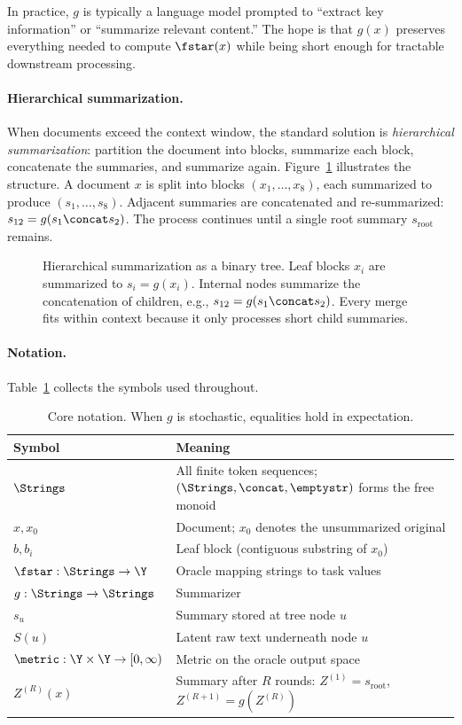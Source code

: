 In practice, $g$ is typically a language model prompted to ``extract key information'' or ``summarize relevant content.'' The hope is that $g(x)$ preserves everything needed to compute $\fstar(x)$ while being short enough for tractable downstream processing.

\paragraph{Hierarchical summarization.}
When documents exceed the context window, the standard solution is \emph{hierarchical summarization}: partition the document into blocks, summarize each block, concatenate the summaries, and summarize again. Figure~\ref{fig:hierarchical_summarization} illustrates the structure. A document $x$ is split into blocks $(x_1, \ldots, x_8)$, each summarized to produce $(s_1, \ldots, s_8)$. Adjacent summaries are concatenated and re-summarized: $s_{12} = g(s_1 \concat s_2)$. The process continues until a single root summary $s_{\text{root}}$ remains.

\begin{figure}[t]
    \centering
    
    \caption{Hierarchical summarization as a binary tree. Leaf blocks $x_i$ are summarized to $s_i = g(x_i)$. Internal nodes summarize the concatenation of children, e.g., $s_{12} = g(s_1 \concat s_2)$. Every merge fits within context because it only processes short child summaries.}
    \label{fig:hierarchical_summarization}
\end{figure}

\paragraph{Notation.}
Table~\ref{tab:notation-main} collects the symbols used throughout.

\begin{table}[t]
\centering\small
\begin{tabular}{ll}
\toprule
Symbol & Meaning \\
\midrule
$\Strings$ & All finite token sequences; $(\Strings, \concat, \emptystr)$ forms the free monoid \\
$x, x_0$ & Document; $x_0$ denotes the unsummarized original \\
$b, b_i$ & Leaf block (contiguous substring of $x_0$) \\
$\fstar: \Strings \to \Y$ & Oracle mapping strings to task values \\
$g: \Strings \to \Strings$ & Summarizer \\
$s_u$ & Summary stored at tree node $u$ \\
$S(u)$ & Latent raw text underneath node $u$ \\
$\metric: \Y \times \Y \to [0, \infty)$ & Metric on the oracle output space \\
$Z^{(R)}(x)$ & Summary after $R$ rounds: $Z^{(1)} = s_{\text{root}}$, $Z^{(R+1)} = g(Z^{(R)})$ \\
\bottomrule
\end{tabular}
\caption{Core notation. When $g$ is stochastic, equalities hold in expectation.}
\label{tab:notation-main}
\end{table}

